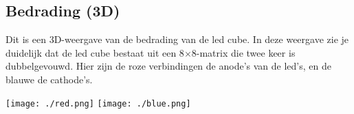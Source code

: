 \documentclass[12pt, a4paper, dutch]{article}
\begin{document}
\subsection{Bedrading (3D)}

Dit is een 3D-weergave van de bedrading van de led cube. In deze weergave zie je
duidelijk dat de led cube bestaat uit een 8$\times$8-matrix die twee keer is
dubbelgevouwd. Hier zijn de roze verbindingen de anode's van de led's, en de blauwe
de cathode's.

\begin{center}
\texttt{[image: ./red.png]}
\hspace{1cm}
\texttt{[image: ./blue.png]}
\end{center}
\end{document}
